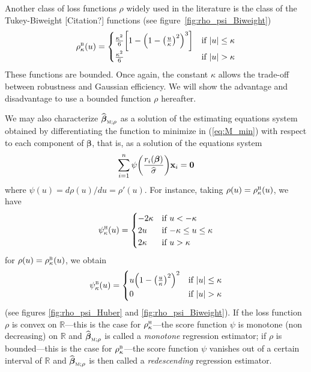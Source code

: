 Another class of loss functions $\rho$ widely used in the literature is the
class of the Tukey-Biweight \alert{[Citation?]} functions (see figure~\ref{fig:rho_psi_Biweight})
%
\begin{equation}
    \label{eq:Tukey_Biweight_function}
    \rho_{\kappa}^{\stsc{B}}(u) = 
        \begin{cases}
            \frac{\kappa^{2}}{6} \left[1 - \left(1 - \left(\frac{u}{\kappa}\right)^{2}\right)^{3}\right] 
                & \text{if $|u| \leq \kappa$}\\
            \frac{\kappa^{2}}{6} 
                & \text{if $|u| > \kappa$}
        \end{cases}
\end{equation}
%
These functions are bounded. Once again, the constant $\kappa$ allows the
trade-off between robustness and Gaussian efficiency. We will show the
advantage and disadvantage to use a bounded function $\rho$ hereafter.

We may also characterize $\sthat{\boldsymbol\beta}_{\stsc{M};\rho}$ as a
solution of the estimating equations system obtained by differentiating the
function to minimize in (\ref{eq:M_min}) with respect to each component of
$\boldsymbol\beta$, that is, as a solution of the equations system
%
\begin{equation}\label{eq:M_equations}
    \sum_{i=1}^{n} \psi\left(\frac{r_{i}(\boldsymbol\beta)}{\sthat{\sigma}}\right) \stvec{x}_{i} = \stvec{0}
\end{equation}
%
where $\psi(u) = d\rho(u) / du = \rho'(u)$. For instance, taking
$\rho(u)=\rho_{\kappa}^{\stsc{H}}(u)$, we have
\[
    \psi_{\kappa}^{\stsc{H}}(u) = 
    \begin{cases}
        -2\kappa    & \text{if $u<-\kappa$}\\
        2u          & \text{if $-\kappa\leq u\leq\kappa$}\\
        2\kappa     & \text{if $u>\kappa$}
    \end{cases}
\]
for $\rho(u) = \rho_{\kappa}^{\stsc{B}}(u)$, we obtain
\[
    \psi_{\kappa}^{\stsc{B}}(u) =
    \begin{cases}
        u\left(1 - \left(\frac{u}{\kappa}\right)^{2}\right)^{2} & \text{if $|u| \leq \kappa$}\\
        0                                                       & \text{if $|u| > \kappa$}
    \end{cases}
\]
(see figures \ref{fig:rho_psi_Huber} and \ref{fig:rho_psi_Biweight}). If the
loss function $\rho$ is convex on $\mathbb{R}$---this is the case for
$\rho_{\kappa}^{\stsc{H}}$---the score function $\psi$ is monotone (non
decreasing) on $\mathbb{R}$ and $\sthat{\boldsymbol\beta}_{\stsc{M};\rho}$ is
called a \emph{monotone} regression  estimator; if $\rho$ is
bounded---this is the case for $\rho_{\kappa}^{\stsc{B}}$---the score function
$\psi$ vanishes out of a certain interval of $\mathbb{R}$ and
$\sthat{\boldsymbol\beta}_{\stsc{M};\rho}$ is then called a \emph{redescending}
regression  estimator.


